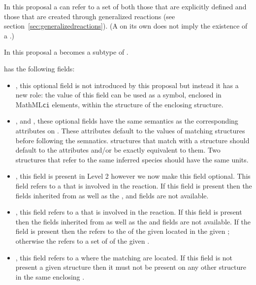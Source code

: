 \documentclass{cekarticle}
\begin{document}
In this proposal a  can refer to a set of  both
those that are explicitly defined and those that are created through generalized reactions
(see section~\ref{sec:generalizedreactions}).  (A  on its own does not
imply the existence of a .)

In this proposal a  becomes a subtype of .

 has the following fields:

\begin{itemize}

\item {}, this optional  field is not introduced by this proposal but instead
it has a new role: the value of this field can be used as a symbol, enclosed in MathML\texttt{ci}
elements, within the  structure of the enclosing  structure.

\item {},  and ,
these optional fields have the same semantics as the corresponding attributes on .
These attributes default to the values of matching  structures before following the
 semnatics.
 structures that match with a  structure should
default to the  attributes and/or be exactly equivalent to them.  Two 
 structures that refer to the same inferred species should have
the same units.

\item {}, this  field is present in Level 2 however we now make this field
optional.  This field refers to a  that is involved in the reaction.  If this field is
present then the fields inherited from  as well as the ,
 and  fields are not available.

\item {}, this  field refers to a  that is
involved in the reaction.  If this field is
present then the fields inherited from  as well as the 
 and  fields are not available.  If the 
field is present then the  refers to the  of
the given  located in the given ; otherwise the
 refers to a set of  of the given .

\item {}, this  field refers to a  where the matching
 are located.  If this field is not present a given 
structure then it must not be present on any other 
 structure in the same enclosing .

\end{itemize}
\end{document}
